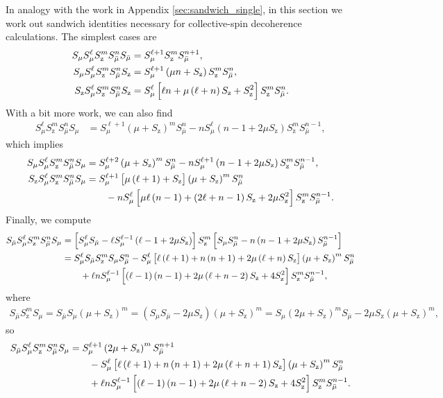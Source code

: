 \documentclass[aps,notitlepage,nofootinbib,11pt]{revtex4-1}
\newcommand{\p}[1]{\left(#1\right)} %
\renewcommand{\sp}[1]{\left[#1\right]} %
\newcommand{\z}{\text{z}}
\newcommand{\bmu}{{\bar\mu}}
\newcommand{\1}{\mathds{1}}
\begin{document}
In analogy with the work in Appendix \ref{sec:sandwich_single}, in
this section we work out sandwich identities necessary for
collective-spin decoherence calculations.  The simplest cases are
\begin{align}
  S_\mu S_\mu^\ell S_\z^m S_\bmu^n S_\bmu
  &= S_\mu^{\ell+1} S_\z^m S_\bmu^{n+1},
  \allowdisplaybreaks \\
  S_\mu S_\mu^\ell S_\z^m S_\bmu^n S_\z
  &= S_\mu^{\ell+1} \p{\mu n+S_\z} S_\z^m S_\bmu^n,
  \allowdisplaybreaks \\
  S_\z S_\mu^\ell S_\z^m S_\bmu^n S_\z
  &= S_\mu^\ell \sp{\ell n + \mu\p{\ell+n} S_\z + S_\z^2}
  S_\z^m S_\bmu^n.
\end{align}
With a bit more work, we can also find
\begin{align}
  S_\mu^\ell S_\z^m S_\bmu^n S_\mu
  &= S_\mu^{\ell+1} \p{\mu+S_\z}^m S_\bmu^n
  - n S_\mu^\ell \p{n-1+2\mu S_\z} S_\z^m S_\bmu^{n-1},
\end{align}
which implies
\begin{align}
  S_\mu S_\mu^\ell S_\z^m S_\bmu^n S_\mu
  &= S_\mu^{\ell+2} \p{\mu+S_\z}^m S_\bmu^n
  - n S_\mu^{\ell+1} \p{n-1+2\mu S_\z} S_\z^m S_\bmu^{n-1},
  \allowdisplaybreaks \\
  S_\z S_\mu^\ell S_\z^m S_\bmu^n S_\mu
  &= S_\mu^{\ell+1} \sp{\mu\p{\ell+1}+S_\z} \p{\mu+S_\z}^m S_\bmu^n
  \notag \\
  &\qquad - n S_\mu^\ell
  \sp{\mu\ell\p{n-1} + \p{2\ell+n-1}S_\z + 2\mu S_\z^2}
  S_\z^m S_\bmu^{n-1}.
\end{align}
Finally, we compute
\begin{align}
  S_\bmu S_\mu^\ell S_\z^m S_\bmu^n S_\mu
  &= \sp{S_\mu^\ell S_\bmu - \ell S_\mu^{\ell-1} \p{\ell-1+2\mu S_\z}}
  S_\z^m
  \sp{S_\mu S_\bmu^n - n \p{n-1+2\mu S_\z} S_\bmu^{n-1}} \\
  &= S_\mu^\ell S_\bmu S_\z^m S_\mu S_\bmu^n
  - S_\mu^\ell \sp{\ell\p{\ell+1} + n\p{n+1}+2\mu\p{\ell+n} S_\z}
  \p{\mu+S_\z}^m S_\bmu^n \notag \\
  &\qquad + \ell n S_\mu^{\ell-1}
  \sp{\p{\ell-1}\p{n-1}+2\mu\p{\ell+n-2} S_\z + 4 S_\z^2}
  S_\z^m S_\bmu^{n-1},
\end{align}
where
\begin{align}
  S_\bmu S_\z^m S_\mu
  = S_\bmu S_\mu \p{\mu+S_\z}^m
  = \p{S_\mu S_\bmu - 2\mu S_\z} \p{\mu+S_\z}^m
  = S_\mu \p{2\mu + S_\z}^m S_\bmu - 2\mu S_\z \p{\mu + S_\z}^m,
\end{align}
so
\begin{align}
  S_\bmu S_\mu^\ell S_\z^m S_\bmu^n S_\mu
  &= S_\mu^{\ell+1} \p{2\mu + S_\z}^m S_\bmu^{n+1} \notag \\
  &\qquad - S_\mu^\ell
  \sp{\ell\p{\ell+1} + n\p{n+1}+2\mu\p{\ell+n+1} S_\z}
  \p{\mu+S_\z}^m S_\bmu^n \notag \\
  &\qquad + \ell n S_\mu^{\ell-1}
  \sp{\p{\ell-1}\p{n-1}+2\mu\p{\ell+n-2} S_\z + 4 S_\z^2}
  S_\z^m S_\bmu^{n-1}.
\end{align}
\end{document}
